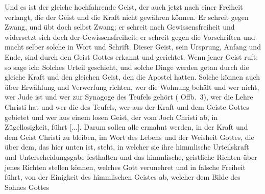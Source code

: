 {Und es ist der gleiche hochfahrende Geist, der auch jetzt nach
einer Freiheit verlangt, die der Geist und die Kraft nicht gewähren
können. Er schreit gegen Zwang, und übt doch selbst Zwang; er
schreit nach Gewissensfreiheit und 
widersetzt sich doch der Gewissensfreiheit; er schreit gegen 
die Vorschriften und macht selber solche
in Wort und Schrift. Dieser Geist, sein Ursprung, Anfang und
Ende, sind durch den Geist Gottes erkannt und gerichtet. Wenn
jener Geist ruft: 
 so sage ich:  Solches
Urteil geschieht, und solche Dinge werden getan durch die gleiche
Kraft und den gleichen Geist, den die Apostel hatten. Solche
können auch über Erwählung und Verwerfung
 richten, wer die
Wohnung behält und wer nicht, wer Jude ist und wer zur
Synagoge des Teufels gehört (
Offb.~3), wer die Lehre Christi hat
und wer die des Teufels, wer aus der Kraft und dem Geiste Gottes
gebietet und wer aus einem losen Geist, der vom Joch Christi
ab, in Zügellosigkeit, führt [...]. Darum sollen alle ermahnt
werden, in der Kraft und dem Geist Christi zu bleiben, im Wort
des Lebens und der Weisheit Gottes, die über dem, das hier
unten ist, steht, in welcher sie ihre himmlische Urteilskraft
und Unterscheidungsgabe festhalten und das himmlische, geistliche 
Richten über jenes Richten stellen können, welches Gott
verunehret und in falsche Freiheit 
führt, von der Einigkeit des
himmlischen Geistes ab, welcher dem Bilde des Sohnes Gottes
}
